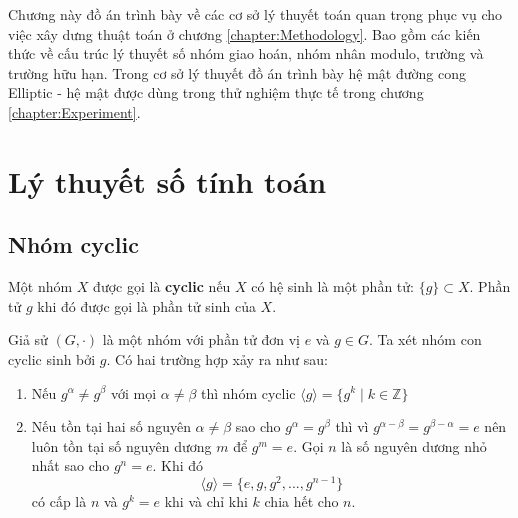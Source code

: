 \documentclass[../main.tex]{subfiles}
\begin{document}
Chương này đồ án trình bày về các cơ sở lý thuyết toán quan trọng phục vụ cho việc xây dưng thuật toán ở chương \ref{chapter:Methodology}. Bao gồm các kiến thức về cấu trúc lý thuyết số nhóm giao hoán, nhóm nhân modulo, trường và trường hữu hạn. Trong cơ sở lý thuyết đồ án trình bày hệ mật đường cong Elliptic - hệ mật được dùng trong thử nghiệm thực tế trong chương \ref{chapter:Experiment}.

\section{Lý thuyết số tính toán}
\subsection{Nhóm cyclic}
\label{section: theory_background}
\begin{dn}
Một nhóm $X$ được gọi là \textbf{cyclic} nếu $X$ có hệ sinh là một phần tử: $\{g\} \subset X$. Phần tử $g$ khi đó được gọi là phần tử sinh của $X$.
\end{dn}
\begin{nx}
Giả sử $(G,\cdot)$ là một nhóm với phần tử đơn vị $e$ và $g \in G$. Ta xét nhóm con cyclic sinh bởi $g$. Có hai trường hợp xảy ra như sau:
\begin{enumerate}
    \item Nếu $g^\alpha \neq g^\beta$ với mọi $\alpha \neq \beta$ thì nhóm cyclic $\langle g \rangle = \{g^k \mid k \in \mathbb{Z}\}$
    \item Nếu tồn tại hai số nguyên $\alpha \neq \beta$ sao cho $g^\alpha = g^\beta$ thì vì $g^{\alpha - \beta} = g^{\beta - \alpha} = e$ nên luôn tồn tại số nguyên dương $m$ để $g^m = e$. Gọi $n$ là số nguyên dương nhỏ nhất sao cho $g^n = e$. Khi đó 
    $$\langle g \rangle = \{e,g,g^2,...,g^{n-1}\} $$
    có cấp là $n$ và $g^k = e$ khi và chỉ khi $k$ chia hết cho $n$.
\end{enumerate}
\end{nx}
\end{document}
